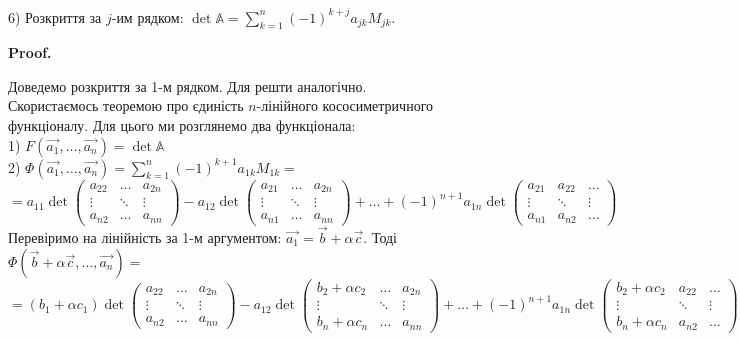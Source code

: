 \documentclass[a4paper, 10pt]{article}
\makeatletter
\def\huge{\displaystyle}
\def\qed{$\blacksquare$}
\theoremstyle{theoremdd}
\theoremstyle{theoremdd}
\theoremstyle{theoremdd}
\theoremstyle{theoremdd}
\theoremstyle{theoremdd}
\theoremstyle{theoremdd}
\theoremstyle{theoremdd}
\theoremstyle{theoremdd}
\renewenvironment{proof}[1][Proof.\\]{\par
\pushQED{\hfill \qed}%
\normalfont \topsep6\p@\@plus6\p@\relax
\trivlist
\item\relax
{\bfseries
#1\@addpunct{.}}\hspace\labelsep\ignorespaces
}{%
\popQED\endtrivlist\@endpefalse
}
\makeatother
\begin{document}
6) Розкриття за $j$-им рядком: $\det \mathbb{A} = \huge \sum_{k=1}^n (-1)^{k+j} a_{jk}M_{jk}$.
\begin{proof}
Доведемо розкриття за 1-м рядком. Для решти аналогічно.\\
Скористаємось теоремою про єдиність $n$-лінійного кососиметричного функціоналу. Для цього ми розглянемо два функціонала:\\
1) $F(\vec{a_1},\dots, \vec{a_n}) = \det \mathbb{A}$\\
2) $\Phi(\vec{a_1},\dots, \vec{a_n}) = \huge \sum_{k=1}^n (-1)^{k+1} a_{1k}M_{1k} =$\\
$= a_{11} \det \begin{pmatrix} a_{22} & \dots & a_{2n} \\ \vdots & \ddots & \vdots \\ a_{n2} & \dots & a_{nn} \end{pmatrix} - a_{12} \det \begin{pmatrix} a_{21} & \dots & a_{2n} \\ \vdots & \ddots & \vdots \\ a_{n1} & \dots & a_{nn} \end{pmatrix} + \dots + (-1)^{n+1} a_{1n} \det \begin{pmatrix} a_{21} & a_{22} & \dots \\ \vdots & \ddots & \vdots \\ a_{n1} & a_{n2} & \dots \end{pmatrix}$\\
Перевіримо на лінійність за 1-м аргументом: $\vec{a_1} = \vec{b} + \alpha \vec{c}$. Тоді\\
$\Phi(\vec{b}+\alpha \vec{c},\dots,\vec{a_n}) =$ \\
$= (b_1 + \alpha c_1) \det \begin{pmatrix} a_{22} & \dots & a_{2n} \\ \vdots & \ddots & \vdots \\ a_{n2} & \dots & a_{nn} \end{pmatrix} - a_{12} \det \begin{pmatrix} b_2 + \alpha c_2 & \dots & a_{2n} \\ \vdots & \ddots & \vdots \\ b_n + \alpha c_n & \dots & a_{nn} \end{pmatrix} + \dots + (-1)^{n+1} a_{1n} \det \begin{pmatrix} b_2 + \alpha c_2 & a_{22} & \dots \\ \vdots & \ddots & \vdots \\ b_n + \alpha c_n & a_{n2} & \dots \end{pmatrix} = $\\

\end{proof}
\end{document}
